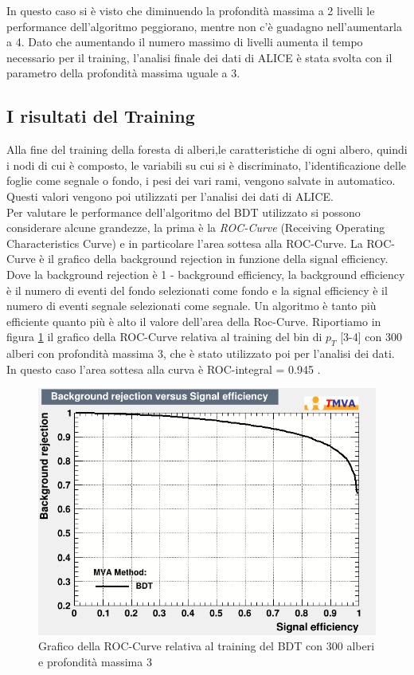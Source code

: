 In questo caso si è visto che diminuendo la profondità massima a 2 livelli le performance dell'algoritmo peggiorano, mentre non c'è guadagno nell'aumentarla a 4. Dato che aumentando il numero massimo di livelli aumenta il tempo necessario per il training, l'analisi finale dei dati di ALICE è stata svolta con il parametro della profondità massima uguale a 3.

\subsection{I risultati del Training}

Alla fine del training della foresta di alberi,le caratteristiche di ogni albero, quindi i nodi di cui è composto, le variabili su cui si è discriminato, l'identificazione delle foglie come segnale o fondo, i pesi dei vari rami, vengono salvate in automatico. Questi valori vengono poi utilizzati per l'analisi dei dati di ALICE. 
\\Per valutare le performance dell'algoritmo del BDT utilizzato si possono considerare alcune grandezze, la prima è la \textit{ROC-Curve} (Receiving Operating Characteristics Curve) e in particolare l'area sottesa alla ROC-Curve. La ROC-Curve è il grafico della background rejection in funzione della signal efficiency. Dove la background rejection è 1 - background efficiency, la background efficiency è il numero di eventi del fondo selezionati come fondo e la signal efficiency è il numero di eventi segnale selezionati come segnale.
Un algoritmo è tanto più efficiente quanto più è alto il valore dell'area della Roc-Curve. %
Riportiamo in figura \ref{fig:RocCurve} il grafico della ROC-Curve relativa al training del bin di $p_T$ [3-4] con 300 alberi con profondità massima 3, che è stato utilizzato poi per l'analisi dei dati. In questo caso l'area sottesa alla curva è ROC-integral = 0.945 . 
    \begin{figure}[htbp] 
        \centering
        \includegraphics[width=0.7\linewidth]{training&testing/RocCurve.png}
        \caption{Grafico della ROC-Curve relativa al training del BDT con 300 alberi e profondità massima 3}
        \label{fig:RocCurve}
    \end{figure}
    
